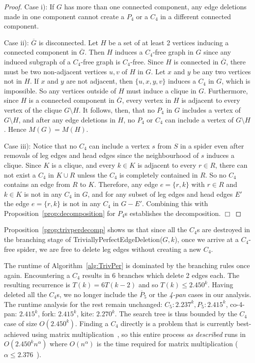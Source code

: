 \documentclass{llncs}
\begin{document}
\begin{proof}

 Case i): If $G$ has more than one connected component, any edge deletions made in one component cannot create a $P_4$ or a $C_4$ in a different connected component.

 Case ii): $\overline{G}$ is disconnected. Let $H$ be a set of at least 2 vertices inducing a connected component in $\overline{G}$. Then $H$ induces a $C_4$-free graph in $G$ since any induced subgraph of a $C_4$-free graph is $C_4$-free. Since $H$ is connected in $\overline{G}$, there must be two non-adjacent vertices $u, v$ of $H$ in $G$. Let $x$ and $y$ be any two vertices not in $H$. If $x$ and $y$ are not adjacent, then $\{u,x,y,v\}$ induces a $C_4$ in $G$, which is impossible. So any vertices outside of $H$ must induce a clique in $G$. Furthermore, since $H$ is a connected component in $\overline{G}$, every vertex in $H$ is adjacent to every vertex of the clique $G\setminus H$. It follows, then, that no $P_4$ in $G$ includes a vertex of $G\setminus H$, and after any edge deletions in $H$, no $P_4$ or $C_4$ can include a vertex of $G\setminus H$. Hence $M(G)=M(H)$.

 Case iii): Notice that no $C_4$ can include a vertex $s$ from $S$ in a spider even after removals of leg edges and head edges since the neighbourhood of $s$ induces a clique. Since $K$ is a clique, and every $k \in K$ is adjacent to every $r \in R$, there can not exist a $C_4$ in $K \cup R$ unless the $C_4$ is completely contained in $R$. So no $C_4$ contains an edge from $R$ to $K$. Therefore, any edge $e = \{r,k\}$ with $r \in R$ and $k \in K$ is not in any $C_4$ in $G$, and for any subset of leg edges and head edges $E'$ the edge $e = \{r,k\}$ is not in any $C_4$ in $G-E'$. Combining this with Proposition~\ref{prop:decomposition} for $P_4$s establishes the decomposition.
\hfill $\Box$

\end{proof}

Proposition~\ref{prop:trivperdecomp} shows us that since all the $C_4$s are destroyed in the branching stage of {\sc TriviallyPerfectEdgeDeletion($G,k$)}, once we arrive at a $C_4$-free spider, we are free to delete leg edges without creating a new $C_4$.







The runtime of Algorithm~\ref{alg:TrivPer} is dominated by the branching rules once again. Encountering a $C_4$ results in 6 branches which delete 2 edges each. The resulting recurrence is $T(k) = 6T(k-2)$ and so $T(k) \leq 2.450^k$. Having deleted all the $C_4$s, we no longer include the $\overline{P}_5$ or the \emph{4-pan} cases in our analysis. The runtime analysis for the rest remain unchanged: $C_5: 2.237^k, P_5: 2.415^k$, co-4-pan: $2.415^k$, fork: $2.415^k$, kite: $2.270^k$. The search tree is thus bounded by the $C_4$ case of size $O(2.450^k)$. Finding a $C_4$ directly is a problem that is currently best-achieved using matrix multiplication~\cite{KrSp}, so this entire process \emph{as described} runs in $O(2.450^kn^\alpha)$ where $O(n^\alpha)$ is the time required for matrix multiplication ($\alpha \leq 2.376$~\cite{CopWin}).
\end{document}
